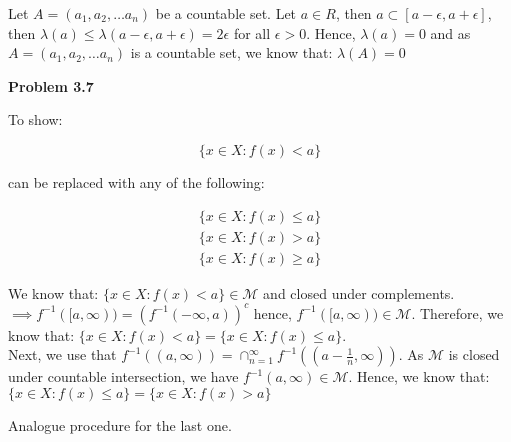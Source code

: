 \documentclass[letterpaper,12pt]{article}
\theoremstyle{definition}
\begin{document}
Let $A=\left(a_{1}, a_{2}, \ldots a_{n}\right)$ be a countable set. Let $a \in R$, then $a \subset[a-\epsilon, a+\epsilon]$, then $\lambda(a) \leq \lambda(a-\epsilon, a+\epsilon)=2 \epsilon$ for all $\epsilon > 0$. Hence, $\lambda(a)=0$ and as $A=\left(a_{1}, a_{2}, \ldots a_{n}\right)$ is a countable set, we know that: $\lambda(A)=0$

\vspace{5mm}
\noindent\textbf{Problem 3.7}

To show:

$$\{x \in X : f(x)<a\}$$

can be replaced with any of the following:

$$ \begin{array}{l}{\{x \in X : f(x) \leq a\}} \\ {\{x \in X : f(x)>a\}} \\ {\{x \in X : f(x) \geq a\}}\end{array}$$

We know that: $\{x \in X : f(x)<a\} \in \mathcal{M}$ and closed under complements. $\implies f^{-1}([a, \infty))=\left(f^{-1}(-\infty, a)\right)^{c}$ hence, $f^{-1}([a, \infty)) \in \mathcal{M}$.
Therefore, we know that: $\{x \in X : f(x)<a\} = \{x \in X : f(x) \leq a\}$.
\\

Next, we use that $f^{-1}((a, \infty))=\cap_{n=1}^{\infty} f^{-1}\left(\left(a-\frac{1}{n}, \infty\right)\right)$. As $\mathcal{M}$ is closed under countable intersection, we have $f^{-1}(a, \infty) \in \mathcal{M}$.  Hence, we know that: $\{x \in X : f(x) \leq a\}= \{x \in X : f(x)>a\}$

Analogue procedure for the last one.
\end{document}
